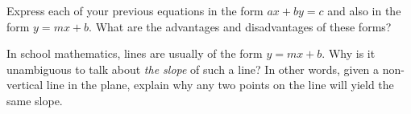 \begin{prob}
Express each of your previous equations in the form $ax + by = c$ and also in the form $y = mx + b$.   What are the advantages and disadvantages of these forms?  
\end{prob}

\begin{prob}
In school mathematics, lines are usually of the form $y = mx + b$.  Why is it unambiguous to talk about \emph{the slope} of such a line?  In other words, given a non-vertical line in the plane, explain why any two points on the line will yield the same slope.  
\end{prob}


